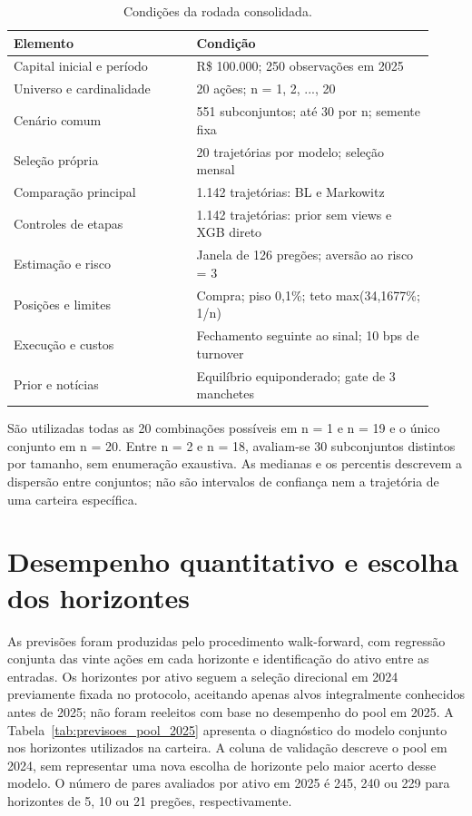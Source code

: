 \begin{table}[H]
\centering
\caption{Condições da rodada consolidada.}
{\footnotesize
\begin{tabular}{p{0.40\linewidth}p{0.52\linewidth}}
\hline
Elemento & Condição \\ \hline
Capital inicial e período & R\$ 100.000; 250 observações em 2025 \\
Universo e cardinalidade & 20 ações; n = 1, 2, ..., 20 \\
Cenário comum & 551 subconjuntos; até 30 por n; semente fixa \\
Seleção própria & 20 trajetórias por modelo; seleção mensal \\
Comparação principal & 1.142 trajetórias: BL e Markowitz \\
Controles de etapas & 1.142 trajetórias: prior sem views e XGB direto \\
Estimação e risco & Janela de 126 pregões; aversão ao risco = 3 \\
Posições e limites & Compra; piso 0,1\%; teto max(34,1677\%; 1/n) \\
Execução e custos & Fechamento seguinte ao sinal; 10 bps de turnover \\
Prior e notícias & Equilíbrio equiponderado; gate de 3 manchetes \\
\hline
\end{tabular}}
\par{}
\end{table}
São utilizadas todas as 20 combinações possíveis em n = 1 e n = 19 e o único conjunto em n = 20. Entre n = 2 e n = 18, avaliam-se 30 subconjuntos distintos por tamanho, sem enumeração exaustiva. As medianas e os percentis descrevem a dispersão entre conjuntos; não são intervalos de confiança nem a trajetória de uma carteira específica.

\section{Desempenho quantitativo e escolha dos horizontes}
As previsões foram produzidas pelo procedimento walk-forward, com regressão conjunta das vinte ações em cada horizonte e identificação do ativo entre as entradas. Os horizontes por ativo seguem a seleção direcional em 2024 previamente fixada no protocolo, aceitando apenas alvos integralmente conhecidos antes de 2025; não foram reeleitos com base no desempenho do pool em 2025. A Tabela~\ref{tab:previsoes_pool_2025} apresenta o diagnóstico do modelo conjunto nos horizontes utilizados na carteira. A coluna de validação descreve o pool em 2024, sem representar uma nova escolha de horizonte pelo maior acerto desse modelo. O número de pares avaliados por ativo em 2025 é 245, 240 ou 229 para horizontes de 5, 10 ou 21 pregões, respectivamente.

